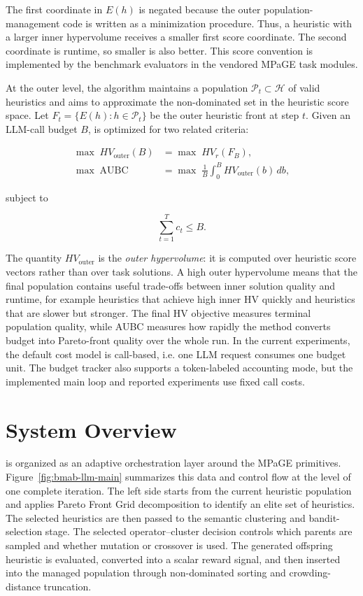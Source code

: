 The first coordinate in $E(h)$ is negated because the outer population-management code is written as a minimization procedure. Thus, a heuristic with a larger inner hypervolume receives a smaller first score coordinate. The second coordinate is runtime, so smaller is also better. This score convention is implemented by the benchmark evaluators in the vendored MPaGE task modules.

At the outer level, the algorithm maintains a population $\mathcal{P}_t \subset \mathcal{H}$ of valid heuristics and aims to approximate the non-dominated set in the heuristic score space. Let $F_t = \{E(h): h \in \mathcal{P}_t\}$ be the outer heuristic front at step $t$. Given an LLM-call budget $B$, \bmab{} is optimized for two related criteria:

\begin{align}
  \max \; HV_{\text{outer}}(B)
  &= \max \; HV_r(F_B), \\
  \max \; \mathrm{AUBC}
  &= \max \; \frac{1}{B}\int_0^B HV_{\text{outer}}(b)\,db,
  \label{eq:aubc-objective}
\end{align}

subject to

\begin{equation}
  \sum_{t=1}^{T} c_t \le B.
\end{equation}

The quantity $HV_{\text{outer}}$ is the \emph{outer hypervolume}: it is computed over heuristic score vectors rather than over task solutions. A high outer hypervolume means that the final population contains useful trade-offs between inner solution quality and runtime, for example heuristics that achieve high inner HV quickly and heuristics that are slower but stronger. The final HV objective measures terminal population quality, while AUBC measures how rapidly the method converts budget into Pareto-front quality over the whole run. In the current experiments, the default cost model is call-based, i.e. one LLM request consumes one budget unit. The budget tracker also supports a token-labeled accounting mode, but the implemented main loop and reported experiments use fixed call costs.

\section{System Overview}

\bmab{} is organized as an adaptive orchestration layer around the MPaGE primitives. Figure~\ref{fig:bmab-llm-main} summarizes this data and control flow at the level of one complete iteration. The left side starts from the current heuristic population and applies Pareto Front Grid decomposition to identify an elite set of heuristics. The selected heuristics are then passed to the semantic clustering and bandit-selection stage. The selected operator--cluster decision controls which parents are sampled and whether mutation or crossover is used. The generated offspring heuristic is evaluated, converted into a scalar reward signal, and then inserted into the managed population through non-dominated sorting and crowding-distance truncation.


